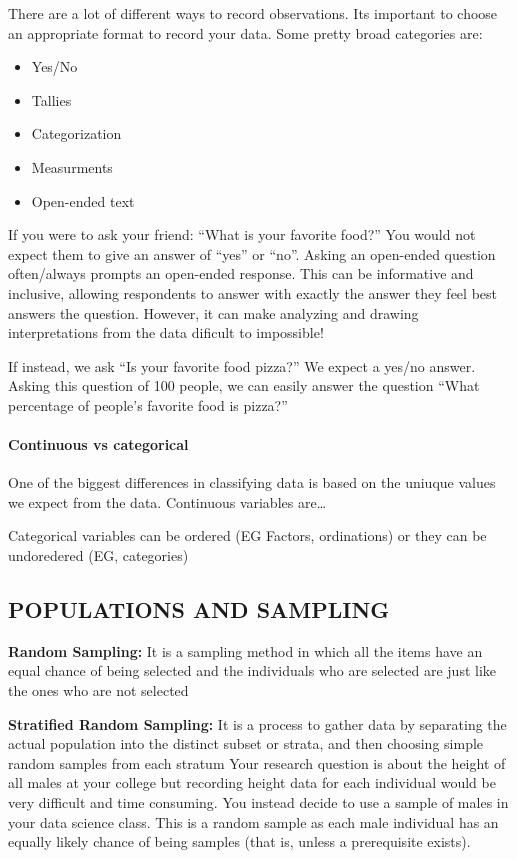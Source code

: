 \documentclass[
]{book}
\providecommand{\tightlist}{%
  \setlength{\itemsep}{0pt}\setlength{\parskip}{0pt}}
\begin{document}
There are a lot of different ways to record observations. Its important to choose an appropriate format to record your data. Some pretty broad categories are:

\begin{itemize}
\tightlist
\item
  Yes/No
\item
  Tallies
\item
  Categorization
\item
  Measurments
\item
  Open-ended text
\end{itemize}

If you were to ask your friend: ``What is your favorite food?'' You would not expect
them to give an answer of ``yes'' or ``no''. Asking an open-ended question often/always prompts an open-ended response. This can be informative and inclusive, allowing respondents to answer with exactly the answer they feel best answers the question. However, it can make analyzing and drawing interpretations from the data dificult to impossible!

If instead, we ask ``Is your favorite food pizza?'' We expect a yes/no answer. Asking this question of 100 people, we can easily answer the question ``What percentage of people's favorite food is pizza?''

\hypertarget{continuous-vs-categorical}{%
\paragraph{Continuous vs categorical}\label{continuous-vs-categorical}}

One of the biggest differences in classifying data is based on the uniuque values we expect from the data. Continuous variables are\ldots{}

Categorical variables can be ordered (EG Factors, ordinations) or they can be undoredered (EG, categories)

\hypertarget{populations-and-sampling}{%
\subsection{POPULATIONS AND SAMPLING}\label{populations-and-sampling}}

\textbf{Random Sampling:} It is a sampling method in which all the items have an equal chance of being selected and the individuals who are selected are just like the ones who are not selected

\textbf{Stratified Random Sampling:} It is a process to gather data by separating the actual population into the distinct subset or strata, and then choosing simple random samples from each stratum Your research question is about the height of all males at your college but recording height data for each individual would be very difficult and time consuming. You instead decide to use a sample of males in your data science class. This is a random sample as each male individual has an equally likely chance of being samples (that is, unless a prerequisite exists).
\end{document}
